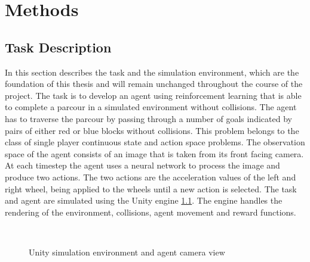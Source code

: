 \chapter{Methods}
\label{cha:Methods}

\section{Task Description}

In this section describes the task and the simulation environment, which are the foundation of this thesis and will remain unchanged throughout the course of the project.
The task is to develop an agent using reinforcement learning that is able to complete a parcour in a simulated environment without collisions. The agent has to traverse the parcour by passing through a number of goals indicated by pairs of either red or blue blocks without collisions. This problem belongs to the class of single player continuous state and action space problems. The observation space of the agent consists of an image that is taken from its front facing camera. At each timestep the agent uses a neural network to process the image and produce two actions. The two actions are the acceleration values of the left and right wheel, being applied to the wheels until a new action is selected.
The task and agent are simulated using the Unity engine \ref{fig:unity}. The engine handles the rendering of the environment, collisions, agent movement and reward functions.

\begin{figure}
     \centering
     \qquad
     \\
     \caption{Unity simulation environment and agent camera view}
     \label{fig:unity}
\end{figure}

